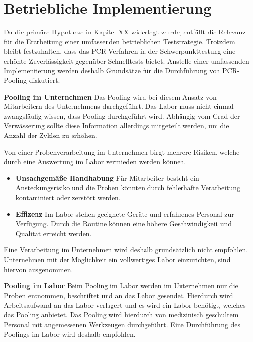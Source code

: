 \section{Betriebliche Implementierung}
Da die primäre Hypothese in Kapitel XX widerlegt wurde, entfällt die Relevanz für die Erarbeitung einer umfassenden betrieblichen Teststrategie.
Trotzdem bleibt festzuhalten, dass das PCR-Verfahren in der Schwerpunkttestung eine erhöhte Zuverlässigkeit gegenüber Schnelltests bietet.
Anstelle einer umfassenden Implementierung werden deshalb Grundsätze für die Durchführung von PCR-Pooling diskutiert.

\textbf{Pooling im Unternehmen}\newline
Das Pooling wird bei diesem Ansatz von Mitarbeitern des Unternehmens durchgeführt.
Das Labor muss nicht einmal zwangsläufig wissen, dass Pooling durchgeführt wird.
Abhängig vom Grad der Verwässerung sollte diese Information allerdings mitgeteilt werden, um die Anzahl der Zyklen zu erhöhen.

Von einer Probenverarbeitung im Unternehmen birgt mehrere Risiken, welche durch eine Auswertung im Labor vermieden werden können.

\begin{itemize}
	\item \textbf{Unsachgemäße Handhabung}\newline
	Für Mitarbeiter besteht ein Ansteckungsrisiko und die Proben könnten durch fehlerhafte Verarbeitung kontaminiert oder zerstört werden.
	\item \textbf{Effizenz}\newline
	Im Labor stehen geeignete Geräte und erfahrenes Personal zur Verfügung.
	Durch die Routine können eine höhere Geschwindigkeit und Qualität erreicht werden.
\end{itemize}

Eine Verarbeitung im Unternehmen wird deshalb grundsätzlich nicht empfohlen.
Unternehmen mit der Möglichkeit ein vollwertiges Labor einzurichten, sind hiervon ausgenommen.

\textbf{Pooling im Labor}\newline
Beim Pooling im Labor werden im Unternehmen nur die Proben entnommen, beschriftet und an das Labor gesendet.
Hierdurch wird Arbeitsaufwand an das Labor verlagert und es wird ein Labor benötigt, welches das Pooling anbietet.
Das Pooling wird hierdurch von medizinisch geschultem Personal mit angemessenen Werkzeugen durchgeführt.
Eine Durchführung des Poolings im Labor wird deshalb empfohlen.

